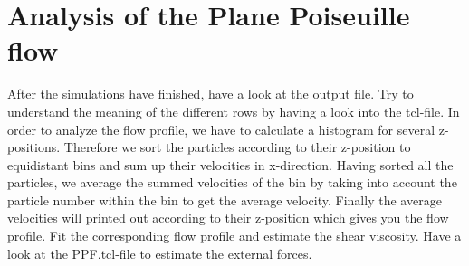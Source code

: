 \documentclass[11pt,a4paper,%
	       headsepline=false, footsepline=false, notitlepage, %
	       bigheadings, %
	       bibtotoc, %
	       final]{scrartcl}
\begin{document}
\section*{Analysis of the Plane Poiseuille flow}
After the simulations have finished, have a look at the output file. Try to understand the meaning of the different rows by having a look into the tcl-file.
In order to analyze the flow profile, we have to calculate a histogram for several z-positions.
Therefore we sort the particles according to their z-position to equidistant bins and sum up their velocities in x-direction. Having sorted all the particles, we average the summed velocities of the bin by taking into account 
the particle number within the bin
to get the 
average velocity. Finally the average velocities will printed out according to their z-position which gives you the flow profile.
Fit the corresponding flow profile and estimate the shear viscosity. Have a look at the PPF.tcl-file to estimate the external forces.
\end{document}

